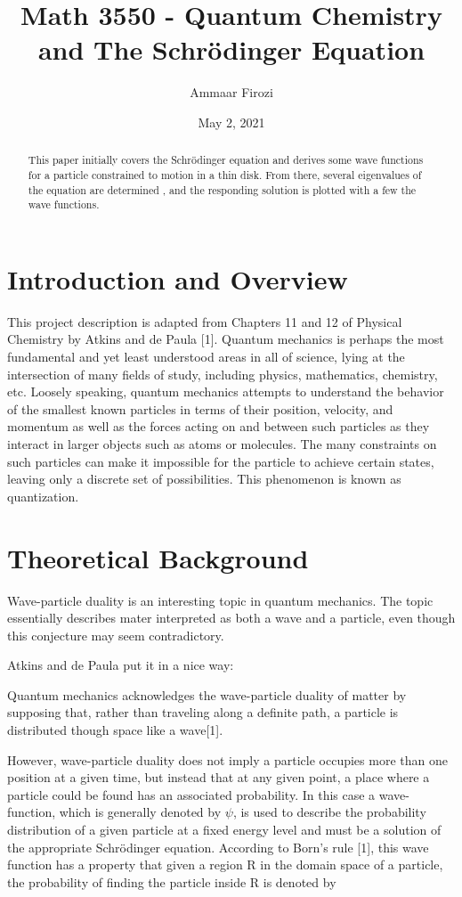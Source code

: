 \documentclass{article}
\title{Math 3550 - Quantum Chemistry and The Schrödinger Equation}
\author{Ammaar Firozi}
\date{May 2, 2021}
\begin{document}
\maketitle
\begin{abstract}
This paper initially covers the Schrödinger equation and derives some wave functions for a particle constrained to motion in a thin disk. From there, several eigenvalues of the equation are determined , and the responding solution is plotted with a few the wave functions. 
\end{abstract}
\section{Introduction and Overview}
This project description is adapted from Chapters 11 and 12 of Physical Chemistry by Atkins and de Paula [1]. Quantum mechanics is perhaps the most fundamental and yet least understood areas in all of science, lying at the intersection of many fields of study, including physics, mathematics, chemistry, etc. Loosely speaking, quantum mechanics attempts to understand the behavior of the smallest known particles in terms of their position, velocity, and momentum as well as the forces acting on and between such particles as they interact in larger objects such as atoms or molecules. The many constraints on such particles can make it impossible for the particle to achieve certain states, leaving only a discrete set of possibilities. This phenomenon is known as quantization.


\section{Theoretical Background}

Wave-particle duality is an interesting topic in quantum mechanics. The topic essentially describes mater interpreted as both a wave and a particle, even though this conjecture may seem contradictory.

Atkins and de Paula put it in a nice way: 

Quantum mechanics acknowledges the wave-particle duality of matter by supposing that, rather than traveling along a definite path, a particle is distributed though space like a wave[1]. 

However, wave-particle duality does not imply a particle occupies more than one position at a given time, but instead that at any given point, a place where a particle could be found has an associated probability. In this case a wave-function, which is generally denoted by $\psi$, is  used to describe the probability distribution of a given particle at a fixed energy level and must be a solution of the appropriate Schrödinger equation. According to Born's rule [1], this wave function has a property that given a region R in the domain space of a particle, the probability of finding the particle inside R is denoted by 
\end{document}
